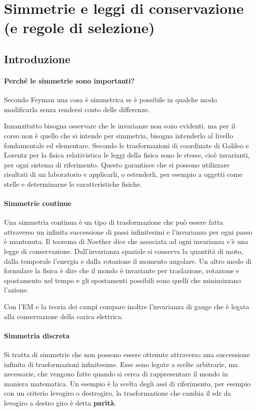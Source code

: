 \documentclass[12pt]{book}
\begin{document}



\chapter{Simmetrie e leggi di conservazione (e regole di selezione)}
\toc
\section{Introduzione}
\subsubsection{Perché le simmetrie sono importanti?}
Secondo Feyman una cosa è simmetrica se è possibile in qualche modo modificarla senza rendersi conto delle differenze.


Innanzitutto bisogna osservare che le invarianze non sono evidenti, ma per il corso non è quello che si intende per simmetria, bisogna intenderlo al livello fondamentale ed elementare. Secondo le trasformazioni di coordinate di Galileo e Lorentz per la fisica relativistica le leggi della fisica sono le stesse, cioè invarianti, per ogni sistema di riferimento. Questo garantisce che si possono utilizzare risultati di un laboratorio e applicarli, o estenderli, per esempio a oggetti come stelle e determinarne le caratteristiche fisiche.

\subsubsection{Simmetrie continue}
Una simmetria continua è un tipo di trasformazione che può essere fatta attraverso un infinita successione di passi infinitesimi e l'invarianza per ogni passo è mantenuta. Il teorema di Noether dice che associata ad ogni invarianza c'è una legge di conservazione. Dall'invarianza spaziale si conserva la quantità di moto, dalla temporale l'energia e dalla rotazione il momento angolare. Un altro modo di formulare la fisica è dire che il mondo è invariante per traslazione, rotazione e spostamento nel tempo e gli spostamenti possibili sono quelli che minimizzano l'azione.

Con l'EM e la teoria dei campi compare inoltre l'invarianza di gauge che è legata alla conservazione della carica elettrica.

 
\subsubsection{Simmetria discreta}
Si tratta di simmetrie che non possono essere ottenute attraverso una successione infinita di trasformazioni infinitesime. Esse sono legate a scelte arbitrarie, ma necessarie, che vengono fatte quando si cerca di rappresentare il mondo in maniera matematica. Un esempio è la scelta degli assi di riferimento, per esempio con un criterio levogiro o destrogiro, la trasformazione che cambia il sdr da levogiro a destro giro è detta \textbf{parità}. 
\end{document}
